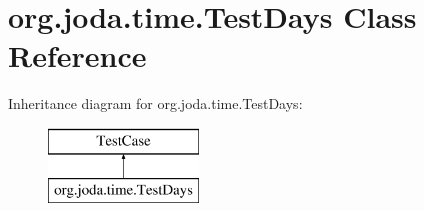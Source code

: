 \hypertarget{classorg_1_1joda_1_1time_1_1_test_days}{\section{org.\-joda.\-time.\-Test\-Days Class Reference}
\label{classorg_1_1joda_1_1time_1_1_test_days}
}
Inheritance diagram for org.\-joda.\-time.\-Test\-Days\-:\begin{figure}[H]
\begin{center}
\leavevmode
\includegraphics[height=2.000000cm]{classorg_1_1joda_1_1time_1_1_test_days}
\end{center}
\end{figure}
